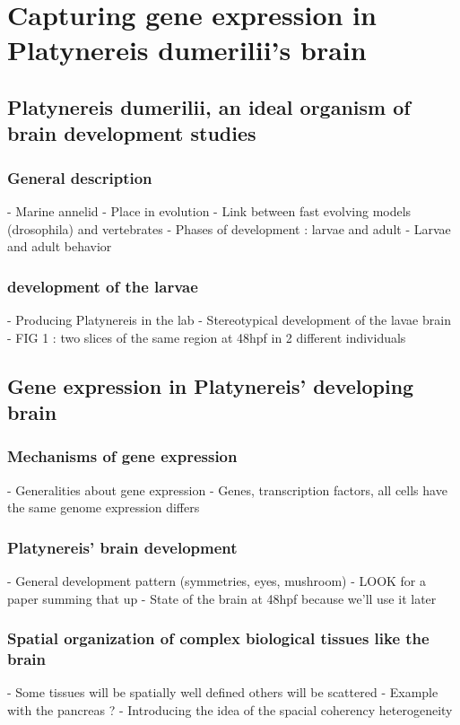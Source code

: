 \chapter{Capturing gene expression in Platynereis dumerilii's brain}\label{ch:background}
\section{Platynereis dumerilii, an ideal organism of brain development studies}
     \subsection*{General description}
    - Marine annelid
    - Place in evolution 
    - Link between fast evolving models (drosophila) and vertebrates
    - Phases of development : larvae and adult
    - Larvae and adult behavior

 
     \subsection*{development of the larvae}
    - Producing Platynereis in the lab
    - Stereotypical development of the lavae brain 
    - FIG 1 : two slices of the same region at 48hpf in 2 different individuals

\section{Gene expression in Platynereis' developing brain}
     \subsection*{Mechanisms of gene expression}
    - Generalities about gene expression
    - Genes, transcription factors, all cells have the same genome expression differs

     \subsection*{Platynereis' brain development}
    - General development pattern (symmetries, eyes, mushroom)
    - LOOK for a paper summing that up
    - State of the brain at 48hpf because we'll use it later

     \subsection*{Spatial organization of complex biological tissues like the brain}
    - Some tissues will be spatially well defined others will be scattered
    - Example with the pancreas ?
    - Introducing the idea of the spacial coherency heterogeneity

